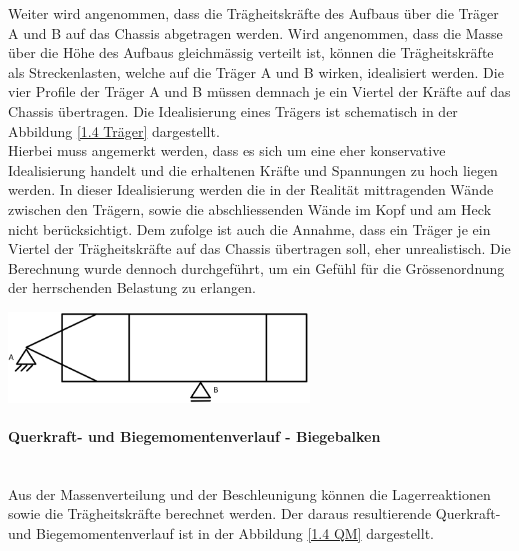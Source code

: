   Weiter wird angenommen, dass die Trägheitskräfte des Aufbaus über die Träger A und B auf das Chassis abgetragen werden. Wird angenommen, dass die Masse über die Höhe des Aufbaus gleichmässig verteilt ist, können die Trägheitskräfte als Streckenlasten, welche auf die Träger A und B wirken, idealisiert werden. Die vier Profile der Träger A und B müssen demnach je ein Viertel der Kräfte auf das Chassis übertragen. Die Idealisierung eines Trägers ist schematisch in der Abbildung \ref{1.4 Träger} dargestellt.\\
  Hierbei muss angemerkt werden, dass es sich um eine eher konservative Idealisierung handelt und die erhaltenen Kräfte und Spannungen zu hoch liegen werden. In dieser Idealisierung werden die in der Realität mittragenden Wände zwischen den Trägern, sowie die abschliessenden Wände im Kopf und am Heck nicht berücksichtigt. Dem zufolge ist auch die Annahme, dass ein Träger je ein Viertel der Trägheitskräfte auf das Chassis übertragen soll, eher unrealistisch. Die Berechnung wurde dennoch durchgeführt, um ein Gefühl für die Grössenordnung der herrschenden Belastung zu erlangen.

  \begin{center}
    \includegraphics[width=0.6\textwidth]{04_Figures/1.4 Lagerung.png}
    \label{1.4 Lagerung}
  \end{center}

  \paragraph{Querkraft- und Biegemomentenverlauf - Biegebalken}\mbox{}\\
  Aus der Massenverteilung und der Beschleunigung können die Lagerreaktionen sowie die Trägheitskräfte berechnet werden. Der daraus resultierende Querkraft- und Biegemomentenverlauf ist in der Abbildung \ref{1.4 QM} dargestellt.

